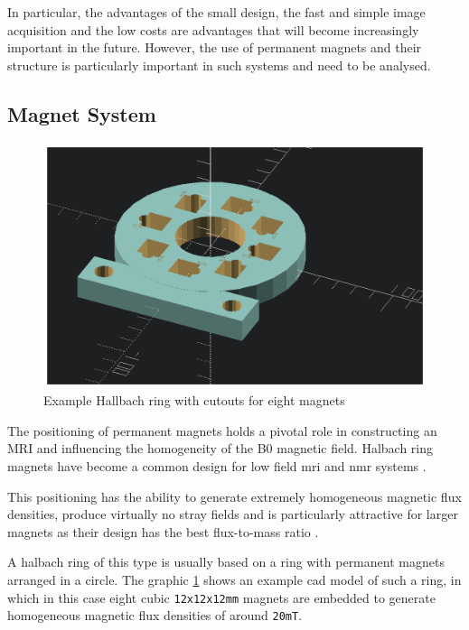 In particular, the advantages of the small design, the fast and simple
image acquisition and the low costs are advantages that will become
increasingly important in the future. However, the use of permanent
magnets and their structure is particularly important in such systems
and need to be analysed.

\hypertarget{magnet-system}{%
\subsection{Magnet System}\label{magnet-system}}

\begin{figure}
\centering
\includegraphics{./generated_images/border_Example_Hallbach_ring_with_cutouts_for_eight_magnets.png}
\caption{Example Hallbach ring with cutouts for eight magnets
\label{Example_Hallbach_ring_with_cutouts_for_eight_magnets.png}}
\end{figure}

The positioning of permanent magnets holds a pivotal role in
constructing an MRI and influencing the homogeneity of the B0 magnetic
field. Halbach ring magnets \cite{Halbach1980DesignOP} have become a
common design for low field \gls{mri} and \gls{nmr} systems
\cite{cmr.a.20165}.

This positioning has the ability to generate extremely homogeneous
magnetic flux densities, produce virtually no stray fields and is
particularly attractive for larger magnets as their design has the best
flux-to-mass ratio \cite{Wickenbrock_2021}.

A halbach ring of this type is usually based on a ring with permanent
magnets arranged in a circle. The graphic
\ref{Example_Hallbach_ring_with_cutouts_for_eight_magnets.png} shows an
example \gls{cad} model of such a ring, in which in this case eight
cubic \passthrough{\lstinline!12x12x12mm!} magnets are embedded to
generate homogeneous magnetic flux densities of around
\passthrough{\lstinline!20mT!}.

